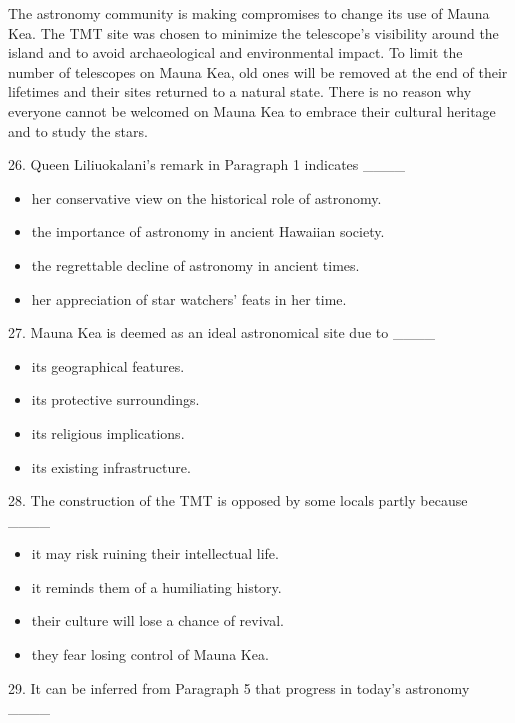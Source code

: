\documentclass[UTF8,11pt]{ctexart}
\begin{document}
The astronomy community is making compromises to change its use of Mauna Kea. The TMT site was chosen to minimize the telescope’s visibility around the island and to avoid archaeological and environmental impact. To limit the number of telescopes on Mauna Kea, old ones will be removed at the end of their lifetimes and their sites returned to a natural state. There is no reason why everyone cannot be welcomed on Mauna Kea to embrace their cultural heritage and to study the stars.


26. Queen Liliuokalani’s remark in Paragraph 1 indicates \_\_\_\_


\begin{itemize}[leftmargin=2em,itemsep=.2em,topsep=.4em]\item[A.] her conservative view on the historical role of astronomy.
\item[B.] the importance of astronomy in ancient Hawaiian society.
\item[C.] the regrettable decline of astronomy in ancient times.
\item[D.] her appreciation of star watchers’ feats in her time.
\end{itemize}

27. Mauna Kea is deemed as an ideal astronomical site due to \_\_\_\_


\begin{itemize}[leftmargin=2em,itemsep=.2em,topsep=.4em]\item[A.] its geographical features.
\item[B.] its protective surroundings.
\item[C.] its religious implications.
\item[D.] its existing infrastructure.
\end{itemize}

28. The construction of the TMT is opposed by some locals partly because \_\_\_\_


\begin{itemize}[leftmargin=2em,itemsep=.2em,topsep=.4em]\item[A.] it may risk ruining their intellectual life.
\item[B.] it reminds them of a humiliating history.
\item[C.] their culture will lose a chance of revival.
\item[D.] they fear losing control of Mauna Kea.
\end{itemize}

29. It can be inferred from Paragraph 5 that progress in today’s astronomy \_\_\_\_
\end{document}

